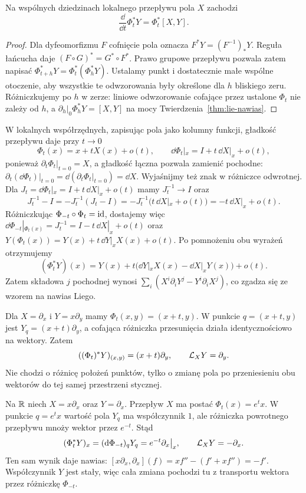\begin{stwierdzenie}\label{prop:lie-ewolucja}
Na wspólnych dziedzinach lokalnego przepływu pola $X$ zachodzi
\[
 \frac{\dd}{\dd t}\Phi_t^*Y=\Phi_t^*[X,Y].
\]
\end{stwierdzenie}
\begin{proof}
Dla dyfeomorfizmu $F$ cofnięcie pola oznacza $F^*Y=(F^{-1})_*Y$.
Reguła łańcucha daje $(F\circ G)^*=G^*\circ F^*$.
Prawo grupowe przepływu pozwala zatem napisać
$\Phi_{t+h}^*Y=\Phi_t^*(\Phi_h^*Y)$.
Ustalamy punkt i dostatecznie małe wspólne otoczenie, aby
wszystkie te odwzorowania były określone dla $h$ bliskiego zeru.
Różniczkujemy po $h$ w zerze: liniowe odwzorowanie cofające przez
ustalone $\Phi_t$ nie zależy od $h$, a
$\left.\partial_h\right|_0\Phi_h^*Y=[X,Y]$
na mocy Twierdzenia~\ref{thm:lie-nawias}.
\end{proof}

\begin{uwaga}
W lokalnych współrzędnych, zapisując pola jako kolumny funkcji,
gładkość przepływu daje przy $t\to0$
\[
 \Phi_t(x)=x+tX(x)+o(t),\qquad
 \dd\Phi_t|_x=I+t\,\dd X|_x+o(t),
\]
ponieważ $\partial_t\Phi_t|_{t=0}=X$,
a gładkość łączna pozwala zamienić pochodne:
$\partial_t(\dd\Phi_t)|_{t=0}
=\dd(\partial_t\Phi_t|_{t=0})=\dd X$.
Wyjaśnijmy też znak w różniczce odwrotnej.
Dla $J_t=\dd\Phi_t|_x=I+t\,\dd X|_x+o(t)$
mamy $J_t^{-1}\to I$ oraz
\[
 J_t^{-1}-I=-J_t^{-1}(J_t-I)
 =-J_t^{-1}\bigl(t\,\dd X|_x+o(t)\bigr)
 =-t\,\dd X|_x+o(t).
\]
Różniczkując $\Phi_{-t}\circ\Phi_t=\mathrm{id}$, dostajemy więc
$\dd\Phi_{-t}|_{\Phi_t(x)}=J_t^{-1}
=I-t\,\dd X|_x+o(t)$ oraz
$Y(\Phi_t(x))=Y(x)+t\,\dd Y|_xX(x)+o(t)$.
Po pomnożeniu obu wyrażeń otrzymujemy
\[
 (\Phi_t^*Y)(x)=Y(x)+t\bigl(\dd Y|_xX(x)-\dd X|_xY(x)\bigr)+o(t).
\]
Zatem składowa $j$ pochodnej wynosi
$\sum_i(X^i\partial_iY^j-Y^i\partial_iX^j)$,
co zgadza się ze wzorem na nawias Liego.
\end{uwaga}

\begin{przyklad}
Dla $X=\partial_x$ i $Y=x\partial_y$ mamy
$\Phi_t(x,y)=(x+t,y)$. W punkcie $q=(x+t,y)$ jest
$Y_q=(x+t)\partial_y$, a cofająca różniczka przesunięcia
działa identycznościowo na wektory. Zatem
\[
 ((\Phi_t)^*Y)_{(x,y)}=(x+t)\partial_y,
 \qquad \mathcal L_XY=\partial_y.
\]
Nie chodzi o różnicę położeń punktów, tylko o zmianę pola
po przeniesieniu obu wektorów do tej samej przestrzeni stycznej.
\end{przyklad}

\begin{przyklad}
Na $\mathbb{R}$ niech $X=x\partial_x$ oraz $Y=\partial_x$.
Przepływ $X$ ma postać $\Phi_t(x)=e^t x$.
W punkcie $q=e^t x$ wartość pola $Y_q$ ma współczynnik $1$,
ale różniczka powrotnego przepływu mnoży wektor przez $e^{-t}$.
Stąd
\[
(\Phi_t^*Y)_x=(\mathrm d\Phi_{-t})_qY_q=e^{-t}\partial_x\big|_x,
\qquad \mathcal L_XY=-\partial_x.
\]
Ten sam wynik daje nawias:
$[x\partial_x,\partial_x](f)=xf''-(f'+xf'')=-f'$.
Współczynnik $Y$ jest stały, więc cała zmiana pochodzi tu z
transportu wektora przez różniczkę $\Phi_{-t}$.
\end{przyklad}

